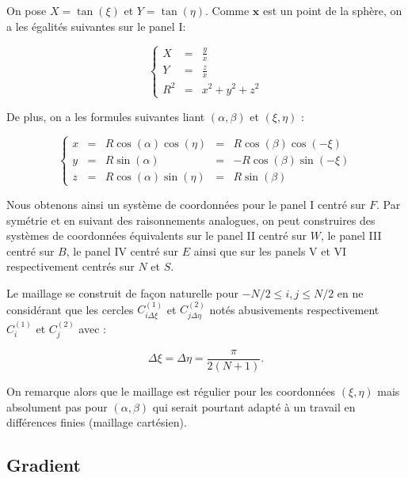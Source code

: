 On pose $X = \tan ( \xi )$ et $Y = \tan ( \eta )$. Comme $\mathbf{x}$ est un point de la sphère, on a les égalités suivantes sur le panel I:

\begin{equation}
\left\{
\begin{array}{rcl}
  X &=& \frac{y}{x} \\
  Y &=& \frac{z}{x} \\
  R^2 &=& x^2 + y^2 + z^2
\end{array}
\right.
\label{coordgno}
\end{equation}

De plus, on a les formules suivantes liant $( \alpha, \beta)$ et $( \xi, \eta )$ :

\begin{equation}
\left\{
\begin{array}{rcccl}
  x &=& R \cos ( \alpha ) \cos ( \eta ) &=& R \cos ( \beta ) \cos ( - \xi ) \\
  y &=& R \sin ( \alpha ) &=& - R \cos ( \beta ) \sin ( - \xi ) \\
  z &=& R \cos ( \alpha ) \sin ( \eta ) &=& R \sin ( \beta )
\end{array}
\right.
\label{coord}
\end{equation}

Nous obtenons ainsi un système de coordonnées pour le panel I centré sur $F$. Par symétrie et en suivant des raisonnements analogues, on peut construires des systèmes de coordonnées équivalents sur le panel II centré sur $W$, le panel III centré sur $B$, le panel IV centré sur $E$ ainsi que sur les panels V et VI respectivement centrés sur $N$ et $S$.

Le maillage se construit de façon naturelle pour $-N/2 \leq i,j \leq N/2$ en ne considérant que les cercles $C^{(1)}_{i \Delta \xi}$ et $C^{(2)}_{j \Delta \eta}$ notés abusivements respectivement $C^{(1)}_i$ et $C^{(2)}_j$ avec :

\begin{equation}
\Delta \xi = \Delta \eta = \dfrac{\pi}{2 ( N+1 )}. 
\end{equation}

On remarque alors que le maillage est régulier pour les coordonnées $(\xi, \eta)$ mais absolument pas pour $(\alpha, \beta)$ qui serait pourtant adapté à un travail en différences finies (maillage cartésien).

\subsection{Gradient}

